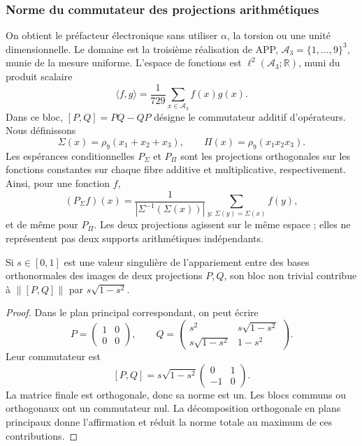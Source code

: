 \subsubsection{Norme du commutateur des projections arithmétiques}

On obtient le préfacteur électronique sans utiliser \(\alpha\), la torsion
ou une unité dimensionnelle. Le domaine est la troisième réalisation de APP,
\(\mathcal A_3=\{1,\ldots,9\}^3\), munie de la mesure uniforme.
L’espace de fonctions est \(\ell^2(\mathcal A_3;\mathbb R)\), muni du produit
scalaire
\[
 \langle f,g\rangle=\frac1{729}\sum_{x\in\mathcal A_3}f(x)g(x).
\]
Dans ce bloc, \([P,Q]=PQ-QP\) désigne le commutateur additif d’opérateurs.
Nous définissons
\[
 \Sigma(x)=\rho_9(x_1+x_2+x_3),\qquad
 \Pi(x)=\rho_9(x_1x_2x_3).
\]
Les espérances conditionnelles \(P_\Sigma\) et \(P_\Pi\) sont les
projections orthogonales sur les fonctions constantes sur chaque fibre
additive et multiplicative, respectivement. Ainsi, pour une fonction \(f\),
\[
 (P_\Sigma f)(x)
 =\frac{1}{|\Sigma^{-1}(\Sigma(x))|}
   \sum_{y:\,\Sigma(y)=\Sigma(x)}f(y),
\]
et de même pour \(P_\Pi\). Les deux projections agissent sur le même espace ; elles ne représentent pas deux supports arithmétiques indépendants.

\begin{lemma}
Si \(s\in[0,1]\) est une valeur singulière de l'appariement entre des bases
orthonormales des images de deux projections \(P,Q\), son bloc non
trivial contribue à \(\|[P,Q]\|\) par
\(s\sqrt{1-s^2}\).
\end{lemma}
\begin{proof}
Dans le plan principal correspondant, on peut écrire
\[
 P=\begin{pmatrix}1&0\\0&0\end{pmatrix},\qquad
 Q=\begin{pmatrix}
 s^2&s\sqrt{1-s^2}\\
 s\sqrt{1-s^2}&1-s^2
 \end{pmatrix}.
\]
Leur commutateur est
\[
 [P,Q]=s\sqrt{1-s^2}
 \begin{pmatrix}0&1\\-1&0\end{pmatrix}.
\]
La matrice finale est orthogonale, donc sa norme est un. Les blocs communs ou orthogonaux ont un commutateur nul. La décomposition orthogonale en plans principaux donne l'affirmation et réduit la norme totale au maximum de ces contributions.
\end{proof}

